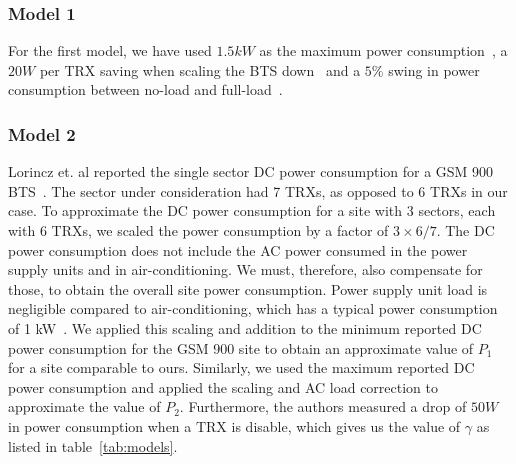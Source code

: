 \subsubsection{Model 1}
\label{subsubsec:model1}For the first model, we have used $1.5kW$ as the maximum power consumption~\cite{mbakwe:btshybribpower:2011:necec}, a $20W$ per TRX saving when scaling the BTS down~\cite{flexibsc} and a $5\%$ swing in power consumption between no-load and full-load~\cite{Peng:2011:BTSSaving:Mobicom}.

\subsubsection{Model 2}
\label{subsubsec:model2} Lorincz et. al reported the single sector DC power consumption for a GSM 900 BTS~\cite{Lorincz:BTS-Measure:Sensors:2012}. The sector under consideration had 7 TRXs, as opposed to 6 TRXs in our case. To approximate the DC power consumption for a site with 3 sectors, each with 6 TRXs, we scaled the power consumption by a factor of $3\times6/7$. The DC power consumption does not include the AC power consumed in the power supply units and in air-conditioning. We must, therefore, also compensate for those, to obtain the overall site power consumption. Power supply unit load is negligible compared to air-conditioning, which has a typical power consumption of 1 kW~\cite{mbakwe:btshybribpower:2011:necec}. We applied this scaling and addition to the minimum reported DC power consumption for the GSM 900 site to obtain an approximate value of $P_1$ for a site comparable to ours. Similarly, we used the maximum reported DC power consumption and applied the scaling and AC load correction to approximate the value of $P_2$. Furthermore, the authors measured a drop of $50W$ in power consumption when a TRX is disable, which gives us the value of $\gamma$ as listed in table~\ref{tab:models}.


